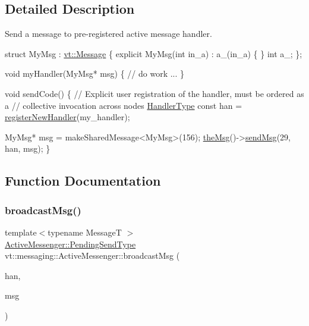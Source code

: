 \subsection{Detailed Description}
Send a message to pre-\/registered active message handler. 


\begin{DoxyCode}
\textcolor{keyword}{struct }MyMsg : \hyperlink{structvt_1_1messaging_1_1_active_msg}{vt::Message} \{
  \textcolor{keyword}{explicit} MyMsg(\textcolor{keywordtype}{int} in\_a) : a\_(in\_a) \{ \}
  \textcolor{keywordtype}{int} a\_;
\};

\textcolor{keywordtype}{void} myHandler(MyMsg* msg) \{
  \textcolor{comment}{// do work ...}
\}

\textcolor{keywordtype}{void} sendCode() \{
  \textcolor{comment}{// Explicit user registration of the handler, must be ordered as a}
  \textcolor{comment}{// collective invocation across nodes}
  \hyperlink{namespacevt_af64846b57dfcaf104da3ef6967917573}{HandlerType} \textcolor{keyword}{const} han = \hyperlink{structvt_1_1messaging_1_1_active_messenger_a018435c71415f6f10dc578230397a85c}{registerNewHandler}(my\_handler);

  MyMsg* msg = makeSharedMessage<MyMsg>(156);
  \hyperlink{namespacevt_aeafd31f866aeb4dc6fc2f6ee97136350}{theMsg}()->\hyperlink{group__preregister_ga55c6ea91181ae20c681e73a356750916}{sendMsg}(29, han, msg);
\}
\end{DoxyCode}
 

\subsection{Function Documentation}
\mbox{\label{group__preregister_gad206aeeb8c0ffe4af72fb758c83a7b78}} 
\subsubsection{\texorpdfstring{broadcast\+Msg()}{broadcastMsg()}\hspace{0.1cm}{\footnotesize\ttfamily [1/4]}}
{\footnotesize\ttfamily template$<$typename MessageT $>$ \\
\hyperlink{structvt_1_1messaging_1_1_active_messenger_a3626a6ca76d8ad4ec7c3b47a2c70d3a8}{Active\+Messenger\+::\+Pending\+Send\+Type} vt\+::messaging\+::\+Active\+Messenger\+::broadcast\+Msg (\begin{DoxyParamCaption}\item[{\hyperlink{namespacevt_af64846b57dfcaf104da3ef6967917573}{Handler\+Type} const \&}]{han,  }\item[{MessageT $\ast$const}]{msg }\end{DoxyParamCaption})}



